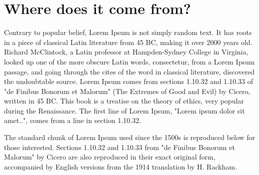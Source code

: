 \documentclass[notes]{mccorvienotes}
\begin{document}
\section{Where does it come from?}

Contrary to popular belief, Lorem Ipsum is not simply random text. It has roots in a piece of classical Latin literature from 45 BC, making it over 2000 years old. Richard McClintock, a Latin professor at Hampden-Sydney College in Virginia, looked up one of the more obscure Latin words, consectetur, from a Lorem Ipsum passage, and going through the cites of the word in classical literature, discovered the undoubtable source. Lorem Ipsum comes from sections 1.10.32 and 1.10.33 of "de Finibus Bonorum et Malorum" (The Extremes of Good and Evil) by Cicero, written in 45 BC. This book is a treatise on the theory of ethics, very popular during the Renaissance. The first line of Lorem Ipsum, "Lorem ipsum dolor sit amet..", comes from a line in section 1.10.32.

The standard chunk of Lorem Ipsum used since the 1500s is reproduced below for those interested. Sections 1.10.32 and 1.10.33 from "de Finibus Bonorum et Malorum" by Cicero are also reproduced in their exact original form, accompanied by English versions from the 1914 translation by H. Rackham.
\end{document}
